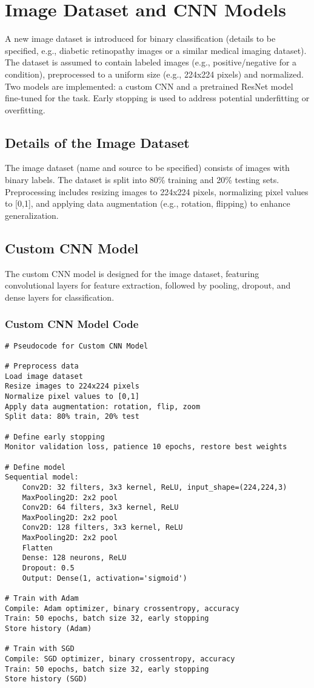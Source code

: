 \documentclass[a4paper,12pt]{article}
\begin{document}
\section*{Image Dataset and CNN Models}
A new image dataset is introduced for binary classification (details to be specified, e.g., diabetic retinopathy images or a similar medical imaging dataset). The dataset is assumed to contain labeled images (e.g., positive/negative for a condition), preprocessed to a uniform size (e.g., 224x224 pixels) and normalized. Two models are implemented: a custom CNN and a pretrained ResNet model fine-tuned for the task. Early stopping is used to address potential underfitting or overfitting.

\subsection*{Details of the Image Dataset}
The image dataset (name and source to be specified) consists of images with binary labels. The dataset is split into 80\% training and 20\% testing sets. Preprocessing includes resizing images to 224x224 pixels, normalizing pixel values to [0,1], and applying data augmentation (e.g., rotation, flipping) to enhance generalization.

\subsection*{Custom CNN Model}
The custom CNN model is designed for the image dataset, featuring convolutional layers for feature extraction, followed by pooling, dropout, and dense layers for classification.

\subsubsection*{Custom CNN Model Code}
\begin{verbatim}
# Pseudocode for Custom CNN Model

# Preprocess data
Load image dataset
Resize images to 224x224 pixels
Normalize pixel values to [0,1]
Apply data augmentation: rotation, flip, zoom
Split data: 80% train, 20% test

# Define early stopping
Monitor validation loss, patience 10 epochs, restore best weights

# Define model
Sequential model:
    Conv2D: 32 filters, 3x3 kernel, ReLU, input_shape=(224,224,3)
    MaxPooling2D: 2x2 pool
    Conv2D: 64 filters, 3x3 kernel, ReLU
    MaxPooling2D: 2x2 pool
    Conv2D: 128 filters, 3x3 kernel, ReLU
    MaxPooling2D: 2x2 pool
    Flatten
    Dense: 128 neurons, ReLU
    Dropout: 0.5
    Output: Dense(1, activation='sigmoid')

# Train with Adam
Compile: Adam optimizer, binary crossentropy, accuracy
Train: 50 epochs, batch size 32, early stopping
Store history (Adam)

# Train with SGD
Compile: SGD optimizer, binary crossentropy, accuracy
Train: 50 epochs, batch size 32, early stopping
Store history (SGD)
\end{verbatim}
\end{document}
